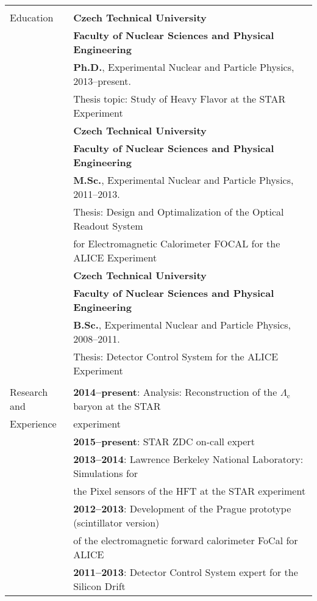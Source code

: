\documentclass[letterpaper,11pt,oneside]{article}
\begin{document}
\noindent \begin{tabular}{@{} l l}
\hline \\
 \Large{Education}    & \textbf{Czech Technical University} \\
     & \textbf{Faculty of Nuclear Sciences and Physical Engineering} \\
     & \textbf{Ph.D.}, Experimental Nuclear and Particle Physics, 2013--present. \\
     & Thesis topic: Study of Heavy Flavor at the STAR Experiment \\[.2cm]
     & \textbf{Czech Technical University} \\
     & \textbf{Faculty of Nuclear Sciences and Physical Engineering} \\
     & \textbf{M.Sc.}, Experimental Nuclear and Particle Physics, 2011--2013. \\
     & Thesis: Design and Optimalization of the Optical Readout System \\
     & for Electromagnetic Calorimeter FOCAL for the ALICE Experiment \\[.2cm]
     & \textbf{Czech Technical University} \\
     & \textbf{Faculty of Nuclear Sciences and Physical Engineering} \\
     & \textbf{B.Sc.}, Experimental Nuclear and Particle Physics, 2008--2011. \\
     & Thesis: Detector Control System for the ALICE Experiment \\
     & \\
 \Large{Research and}    & \textbf{2014--present}: Analysis: Reconstruction of the $\Lambda_\mathrm{c}$ baryon  at the STAR \\
 \Large{Experience}    & experiment \\[.2cm]
     & \textbf{2015--present}: STAR ZDC on-call expert \\[.2cm]
     & \textbf{2013--2014}: Lawrence Berkeley National Laboratory: Simulations for\\ 
     & the Pixel sensors of the HFT at the STAR experiment \\[.2cm]
     & \textbf{2012--2013}: Development of the Prague prototype (scintillator version) \\ 
     & of the electromagnetic forward calorimeter FoCal for ALICE\\[.2cm]
     & \textbf{2011--2013}: Detector Control System expert for the Silicon Drift \\

\end{tabular}
\end{document}
